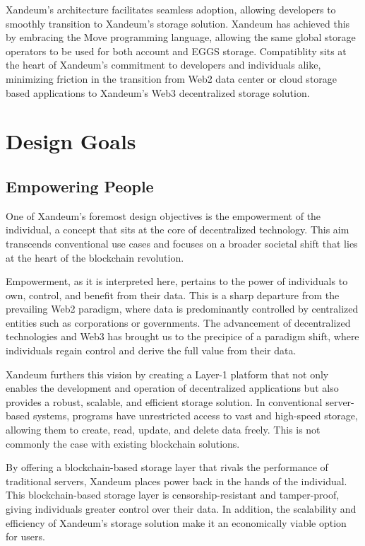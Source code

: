 \documentclass[11pt]{article}   	%
\begin{document}
Xandeum's architecture facilitates seamless adoption, allowing developers to smoothly transition to Xandeum's storage solution. Xandeum has achieved this by embracing the Move programming language, allowing the same global storage operators to be used for both account and EGGS storage. Compatiblity sits at the heart of Xandeum's commitment to developers and individuals alike, minimizing friction in the transition from Web2 data center or cloud storage based applications to Xandeum's Web3 decentralized storage solution.

\section{Design Goals}
\subsection{Empowering People}
One of Xandeum's foremost design objectives is the empowerment of the individual, a concept that sits at the core of decentralized technology. This aim transcends conventional use cases and focuses on a broader societal shift that lies at the heart of the blockchain revolution.

Empowerment, as it is interpreted here, pertains to the power of individuals to own, control, and benefit from their data. This is a sharp departure from the prevailing Web2 paradigm, where data is predominantly controlled by centralized entities such as corporations or governments. The advancement of decentralized technologies and Web3 has brought us to the precipice of a paradigm shift, where individuals regain control and derive the full value from their data.

Xandeum furthers this vision by creating a Layer-1 platform that not only enables the development and operation of decentralized applications but also provides a robust, scalable, and efficient storage solution. In conventional server-based systems, programs have unrestricted access to vast and high-speed storage, allowing them to create, read, update, and delete data freely. This is not commonly the case with existing blockchain solutions.

By offering a blockchain-based storage layer that rivals the performance of traditional servers, Xandeum places power back in the hands of the individual. This blockchain-based storage layer is censorship-resistant and tamper-proof, giving individuals greater control over their data. In addition, the scalability and efficiency of Xandeum's storage solution make it an economically viable option for users.
\end{document}
